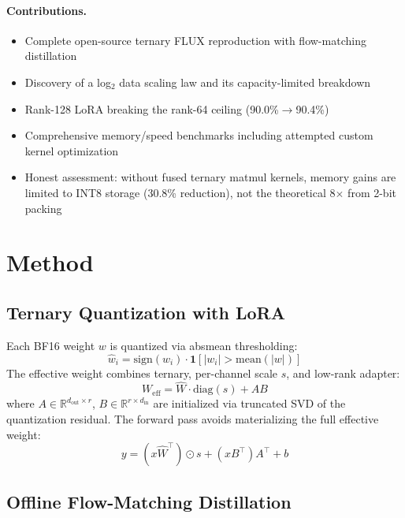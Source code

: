 \documentclass[11pt]{article}
\begin{document}
\paragraph{Contributions.}
\begin{itemize}[nosep,leftmargin=1.5em]
  \item Complete open-source ternary FLUX reproduction with flow-matching distillation
  \item Discovery of a log$_2$ data scaling law and its capacity-limited breakdown
  \item Rank-128 LoRA breaking the rank-64 ceiling (90.0\%$\to$90.4\%)
  \item Comprehensive memory/speed benchmarks including attempted custom kernel optimization
  \item Honest assessment: without fused ternary matmul kernels, memory gains are limited to INT8 storage (30.8\% reduction), not the theoretical 8$\times$ from 2-bit packing
\end{itemize}

\section{Method}

\subsection{Ternary Quantization with LoRA}

Each BF16 weight $w$ is quantized via absmean thresholding:
\begin{equation}
  \hat{w}_i = \text{sign}(w_i) \cdot \mathbf{1}[|w_i| > \text{mean}(|w|)]
\end{equation}
The effective weight combines ternary, per-channel scale $s$, and low-rank adapter:
\begin{equation}
  W_{\text{eff}} = \hat{W} \cdot \text{diag}(s) + AB
\end{equation}
where $A \in \mathbb{R}^{d_{\text{out}} \times r}$, $B \in \mathbb{R}^{r \times d_{\text{in}}}$ are initialized via truncated SVD of the quantization residual.
The forward pass avoids materializing the full effective weight:
\begin{equation}
  y = (x \hat{W}^\top) \odot s + (xB^\top)A^\top + b
\end{equation}

\subsection{Offline Flow-Matching Distillation}
\end{document}
